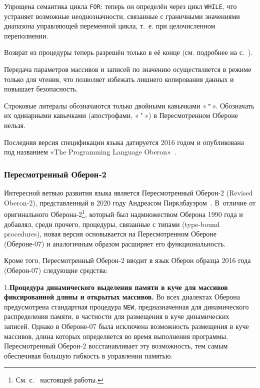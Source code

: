 \documentclass[utf8]{lgu}
\newcommand{\code}[1]{{\normalsize\texttt{#1}}}
\begin{document}
Упрощена семантика цикла \code{FOR}: теперь он определён через цикл \code{WHILE}, что устраняет возможные неоднозначности, связанные с граничными значениями диапазона управляющей переменной цикла, т.~е. при целочисленном переполнении.

Возврат из процедуры теперь разрешён только в её конце (см. подробнее на с.~\pageref{sec:Oberon07Return}).

Передача параметров массивов и записей по значению осуществляется в режиме только для чтения, что позволяет избежать лишнего копирования данных и повышает безопасность.

Строковые литералы обозначаются только двойными кавычками «\,\code{"}\,». Обозначать их одинарными кавычками (апострофами, «\,\code{'}\,») в Пересмотренном Обероне нельзя.

Последняя версия спецификации языка датируется 2016 годом и опубликована под названием «The Programming Language Oberon»~\cite{Oberon07Report}.

\subsubsection{Пересмотренный Оберон‑2}

\firstparskip Интересной ветвью развития языка является Пересмотренный Оберон‑2 (Revised Oberon-2), представленный в 2020 году Андреасом Пирклбауэром~\cite{RevisedOberon2Report}. В~отличие от оригинального Оберона‑2\footnote{См. с.~\pageref{Oberon2} настоящей работы.}, который был надмножеством Оберона 1990 года и добавлял, среди прочего, процедуры, связанные с типами (type-bound procedures), новая версия основывается на Пересмотренном Обероне (Обероне-07) и аналогичным образом расширяет его функциональность.

Кроме того, Пересмотренный Оберон‑2 вводит в язык Оберон образца 2016 года (Оберон-07) следующие средства:

1.\hspace{0.5em}\textbf{Процедура динамического выделения памяти в куче для массивов фиксированной длины и открытых массивов.} Во всех диалектах Оберона предусмотрена стандартная процедура \code{NEW}, предназначенная для динамического распределения памяти, в частности для размещения в куче динамических записей. Однако в Обероне-07 была исключена возможность размещения в куче массивов, длина которых определяется во время выполнения программы. Пересмотренный Оберон‑2 восстанавливает эту возможность, тем самым обеспечивая большую гибкость в управлении памятью.
\end{document}
